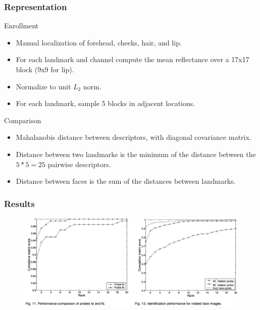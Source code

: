\documentclass{beamer}
\begin{document}
\begin{frame}
\frametitle{Representation}
\begin{block}{Enrollment}
\begin{itemize}
\item Manual localization of forehead, cheeks, hair, and lip.
\item For each landmark and channel compute the mean reflectance over a 17x17 block (9x9 for lip).
\item Normalize to unit $L_2$ norm.
\item For each landmark, sample 5 blocks in adjacent locations.
\end{itemize}
\end{block}
\pause
\begin{block}{Comparison}
\begin{itemize}
\item Mahalanobis distance between descriptors, with diagonal covariance matrix.
\item Distance between two landmarks is the minimum of the distance between the $5*5=25$ pairwise descriptors.
\item Distance between faces is the sum of the distances between landmarks.
\end{itemize}
\end{block}
\end{frame}

\begin{frame}
\frametitle{Results}
\begin{figure}
\includegraphics[width=\textwidth]{hyperspectralResults1}
\end{figure}
\end{frame}
\end{document}
